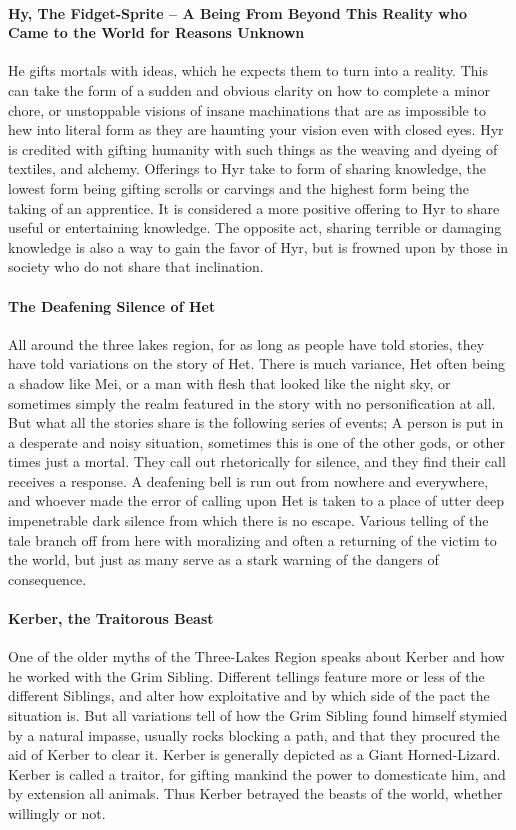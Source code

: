 \paragraph{Hy, The Fidget-Sprite -- A Being From Beyond This Reality who Came to the World for Reasons Unknown}
He gifts mortals with ideas, which he expects them to turn into a reality. This can take the form of a sudden and obvious clarity on how to complete a minor chore, or unstoppable visions of insane machinations that are as impossible to hew into literal form as they are haunting your vision even with closed eyes. Hyr is credited with gifting humanity with such things as the weaving and dyeing of textiles, and alchemy. Offerings to Hyr take to form of sharing knowledge, the lowest form being gifting scrolls or carvings and the highest form being the taking of an apprentice. It is considered a more positive offering to Hyr to share useful or entertaining knowledge. The opposite act, sharing terrible or damaging knowledge is also a way to gain the favor of Hyr, but is frowned upon by those in society who do not share that inclination.

\paragraph{The Deafening Silence of Het}
All around the three lakes region, for as long as people have told stories, they have told variations on the story of Het. There is much variance, Het often being a shadow like Mei, or a man with flesh that looked like the night sky, or sometimes simply the realm featured in the story with no personification at all. But what all the stories share is the following series of events; A person is put in a desperate and noisy situation, sometimes this is one of the other gods, or other times just a mortal. They call out rhetorically for silence, and they find their call receives a response. A deafening bell is run out from nowhere and everywhere, and whoever made the error of calling upon Het is taken to a place of utter deep impenetrable dark silence from which there is no escape. Various telling of the tale branch off from here with moralizing and often a returning of the victim to the world, but just as many serve as a stark warning of the dangers of consequence.

\paragraph{Kerber, the Traitorous Beast}
One of the older myths of the Three-Lakes Region speaks about Kerber and how he worked with the Grim Sibling. Different tellings feature more or less of the different Siblings, and alter how exploitative and by which side of the pact the situation is. But all variations tell of how the Grim Sibling found himself stymied by a natural impasse, usually rocks blocking a path, and that they procured the aid of Kerber to clear it. Kerber is generally depicted as a Giant Horned-Lizard. Kerber is called a traitor, for gifting mankind the power to domesticate him, and by extension all animals. Thus Kerber betrayed the beasts of the world, whether willingly or not.

